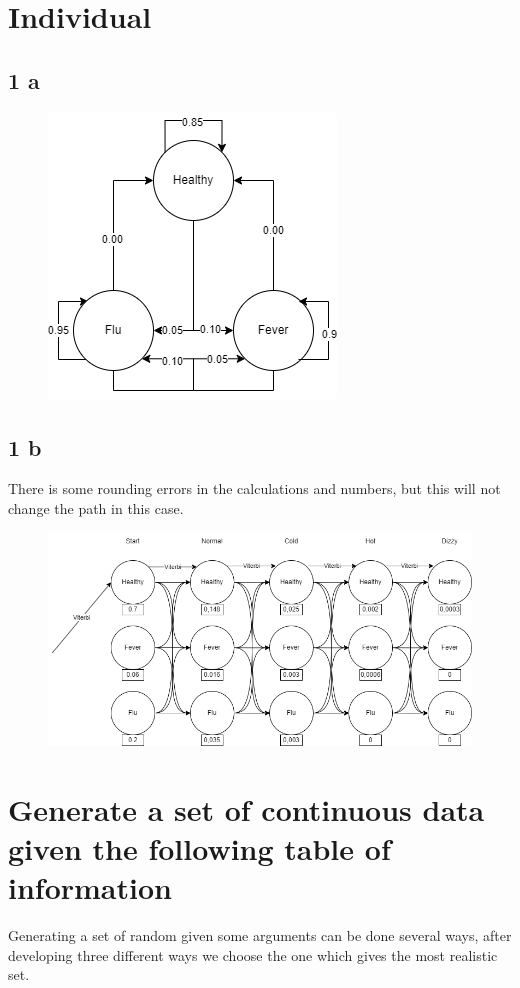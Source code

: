 \section{Individual}
\subsection{1 a}
\begin{figure}[!h]
	\begin{center}
		\includegraphics[width=.5\textwidth]{UML0.drawio}
	\end{center}
\end{figure}
\subsection{1 b}
There is some rounding errors in the calculations and numbers, but this will not change the path in this case.
\begin{figure}[!h]
	\begin{center}
		\includegraphics[width=.8\textwidth]{UML1.drawio}
	\end{center}
\end{figure}

\newpage
\section{Generate a set of continuous data given the following table of information}
Generating a set of random given some arguments can be done several ways, after developing three different ways we choose the one which gives the most realistic set.

